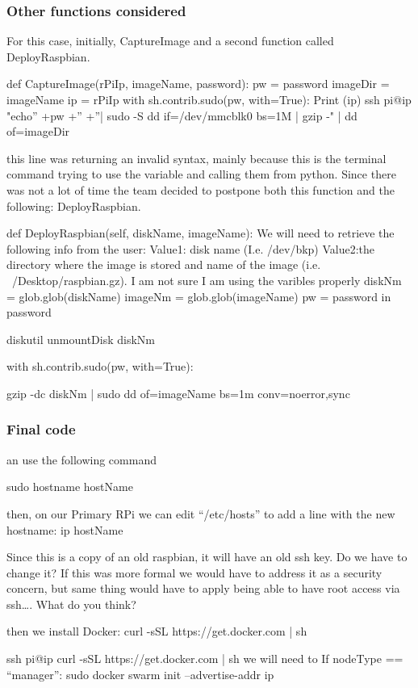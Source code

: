 \documentclass[sigconf]{acmart}
\begin{document}
	\subsubsection{Other functions considered}
	For this case, initially, CaptureImage and a second function called DeployRaspbian.
	
	
	def CaptureImage(rPiIp, imageName, password):
	pw = password
	imageDir = imageName
	ip = rPiIp
	with sh.contrib.sudo(pw, with=True):
	Print (ip)        
	ssh pi@ip "echo” +pw +” +”| sudo -S dd if=/dev/mmcblk0 bs=1M | gzip -" | dd of=imageDir
	
	this line was returning an invalid syntax, mainly because this is the terminal command trying to use the variable and calling them from python. Since there was not a lot of time the team decided to postpone both this function and the following: DeployRaspbian.
	
	def DeployRaspbian(self, diskName, imageName):
	We will need to retrieve the following info from the user: Value1: disk name (I.e.  /dev/bkp)
	Value2:the directory where the image is stored and name of the image (i.e. ~/Desktop/raspbian.gz).  
	I am not sure I am using the varibles properly
	﻿diskNm = glob.glob(diskName)
	﻿imageNm = glob.glob(imageName)
	pw = password in password
	
	diskutil unmountDisk diskNm
	
	with sh.contrib.sudo(pw, with=True):
	
	gzip -dc diskNm | sudo dd of=imageName bs=1m conv=noerror,sync
	
	
	
	\subsubsection{Final code}
	
	an use the following command
	
	sudo hostname hostName
	
	then, on our Primary RPi we can edit “/etc/hosts” to add a line with the new hostname:
	ip hostName
	
	Since this is a copy of an old raspbian, it will have an old ssh key. Do we have to change it? If this was more formal we would have to address it as a security concern, but same thing would have to apply being able to have root access via ssh…. What do you think?
	
	then we install Docker: curl -sSL https://get.docker.com | sh
	
	ssh pi@ip curl -sSL https://get.docker.com | sh
	we will need to
	If nodeType == “manager”:
	sudo docker swarm init --advertise-addr ip
	
\end{document}
